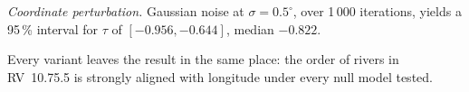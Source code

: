 \documentclass[11pt]{article}
\begin{document}
\textit{Coordinate perturbation.} Gaussian noise at
$\sigma = 0.5^\circ$, over 1\,000 iterations, yields a 95\,\%
interval for $\tau$ of $[-0.956, -0.644]$, median $-0.822$.

\begin{table}[t]
\caption{RV~10.75.5 sensitivity-analysis summary. Every variant has
$n \leq 10$, so ``$p$ (two-sided)'' is the \emph{exact} two-sided
Kendall-$\tau$ $p$-value rather than a permutation estimate.}
\label{tab:sensitivity}
\centering\footnotesize
\setlength{\tabcolsep}{5pt}
\resizebox{\textwidth}{!}{}
\end{table}

Every variant leaves the result in the same place: the order of
rivers in RV~10.75.5 is strongly aligned with longitude under every
null model tested.



\end{document}
